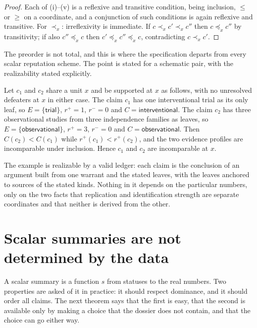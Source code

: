 \begin{proof}
Each of (i)--(v) is a reflexive and transitive condition, being inclusion, $\le$ or $\ge$ on a coordinate, and a conjunction of such conditions is again reflexive and transitive. For $\prec_x$: irreflexivity is immediate. If $c\prec_x c'\prec_x c''$ then $c\preceq_x c''$ by transitivity; if also $c''\preceq_x c$ then $c'\preceq_x c''\preceq_x c$, contradicting $c\prec_x c'$.
\end{proof}

The preorder is not total, and this is where the specification departs from every scalar reputation scheme. The point is stated for a schematic pair, with the realizability stated explicitly.

\begin{example}\label{ex:incomparable}
Let $c_1$ and $c_2$ share a unit $x$ and be supported at $x$ as follows, with no unresolved defeaters at $x$ in either case. The claim $c_1$ has one interventional trial as its only leaf, so $E=\{\textsf{trial}\}$, $r^+=1$, $r^-=0$ and $C=\textsf{interventional}$. The claim $c_2$ has three observational studies from three independence families as leaves, so $E=\{\textsf{observational}\}$, $r^+=3$, $r^-=0$ and $C=\textsf{observational}$. Then $C(c_2)<C(c_1)$ while $r^+(c_1)<r^+(c_2)$, and the two evidence profiles are incomparable under inclusion. Hence $c_1$ and $c_2$ are incomparable at $x$.
\end{example}

The example is realizable by a valid ledger: each claim is the conclusion of an argument built from one warrant and the stated leaves, with the leaves anchored to sources of the stated kinds. Nothing in it depends on the particular numbers, only on the two facts that replication and identification strength are separate coordinates and that neither is derived from the other.

\section{Scalar summaries are not determined by the data}\label{sec:scalar}

A scalar summary is a function $s$ from statuses to the real numbers. Two properties are asked of it in practice: it should respect dominance, and it should order all claims. The next theorem says that the first is easy, that the second is available only by making a choice that the dossier does not contain, and that the choice can go either way.

